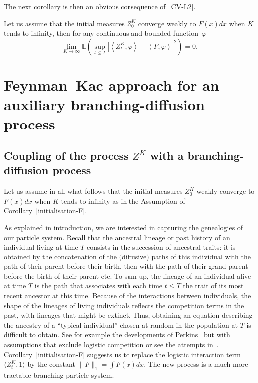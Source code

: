 \documentclass[AHL,Unicode,longabstracts,published]{cedram}
\newcommand*\E{\mathbb{E}}
\begin{document}
The next corollary is then an obvious consequence of~\eqref{CV-L2}.
\begin{coro}\label{initialisation-F}
Let us assume that the initial measures $Z^{K}_{0}$ converge weakly to $F(x)dx$ when $K$ tends to infinity, then for any continuous and bounded function~$\varphi$
\begin{equation}\label{CV-F}
\lim_{K \to \infty}\E\left(\sup_{t \le T} \left|\left\langle Z^{K}_{t},\varphi\right\rangle - \left\langle F,\varphi\right\rangle\right|^2\right) = 0.
\end{equation}
\end{coro}

\section{Feynman--Kac approach for an auxiliary branching-diffusion process}\label{sec:Feynman-Kac}
\subsection{Coupling of the process \texorpdfstring{$Z^K$}{ZK} with a branching-diffusion process}\label{sec:coupling}


Let us assume in all what follows that the initial measures $Z^{K}_{0}$ weakly converge to $F(x)dx$ when $K$ tends to infinity as in the Assumption of Corollary~\ref{initialisation-F}.


As explained in introduction, we are interested in capturing the genealogies of our particle system. Recall that the ancestral lineage or past history of an individual living at time $T$ consists in the succession of ancestral traits: it is obtained by the concatenation of the (diffusive) paths of this individual with the path of their parent before their birth, then with the path of their grand-parent before the birth of their parent etc. To sum up, the lineage of an individual alive at time $T$ is the path that associates with each time $t\leq T$ the trait of its most recent ancestor at this time. Because of the interactions between individuals, the shape of the lineages of living individuals reflects the competition terms in the past, with lineages that might be extinct. Thus, obtaining an equation describing the ancestry of a ``typical individual'' chosen at random in the population at $T$ is difficult to obtain. See for example the developments of Perkins~\cite{perkinsAMS} but with assumptions that exclude logistic competition or see the attempts in~\cite{meleardtran_suphist}. Corollary~\ref{initialisation-F} suggests us to replace the logistic interaction term $ \langle Z^{K}_{t},1\rangle$ by the constant $\|F\|_1 = \int F(x)dx$. The new process is a much more tractable branching particle system.
\end{document}

